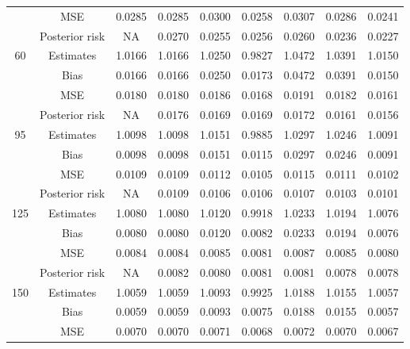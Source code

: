 \documentclass[a4paper,12pt]{report}
\begin{document}
\begin{minipage}{\linewidth}
{\begin{tabular}{|c|c|c|c|c|c|c|c|c|}
			&MSE            &0.0285 &0.0285 &0.0300 &0.0258 &0.0307 &0.0286 &0.0241 \\
			&Posterior risk    &NA &0.0270 &0.0255 &0.0256 &0.0260 &0.0236 &0.0227 \\ \hline
			60&				Estimates      &1.0166 &1.0166 &1.0250 &0.9827 &1.0472 &1.0391 &1.0150 \\
			&Bias           &0.0166 &0.0166 &0.0250 &0.0173 &0.0472 &0.0391 &0.0150 \\
			&MSE            &0.0180 &0.0180 &0.0186 &0.0168 &0.0191 &0.0182 &0.0161 \\
			&Posterior risk    &NA &0.0176 &0.0169 &0.0169 &0.0172 &0.0161 &0.0156 \\ \hline
			95&Estimates      &1.0098 &1.0098 &1.0151 &0.9885 &1.0297 &1.0246 &1.0091 \\
			&Bias           &0.0098 &0.0098 &0.0151 &0.0115 &0.0297 &0.0246 &0.0091 \\
			&MSE            &0.0109 &0.0109 &0.0112 &0.0105 &0.0115 &0.0111 &0.0102 \\
			&Posterior risk    &NA &0.0109 &0.0106 &0.0106 &0.0107 &0.0103 &0.0101 \\ \hline
			125&Estimates      &1.0080 &1.0080 &1.0120 &0.9918 &1.0233 &1.0194 &1.0076 \\
			&Bias           &0.0080 &0.0080 &0.0120 &0.0082 &0.0233 &0.0194 &0.0076 \\
			&MSE            &0.0084 &0.0084 &0.0085 &0.0081 &0.0087 &0.0085 &0.0080 \\
			&Posterior risk    &NA &0.0082 &0.0080 &0.0081 &0.0081 &0.0078 &0.0078 \\ \hline
			150&Estimates      &1.0059 &1.0059 &1.0093 &0.9925 &1.0188 &1.0155 &1.0057 \\
			&Bias           &0.0059 &0.0059 &0.0093 &0.0075 &0.0188 &0.0155 &0.0057 \\
			&MSE            &0.0070 &0.0070 &0.0071 &0.0068 &0.0072 &0.0070 &0.0067 \\

\end{tabular}}
\end{minipage}
\end{document}
